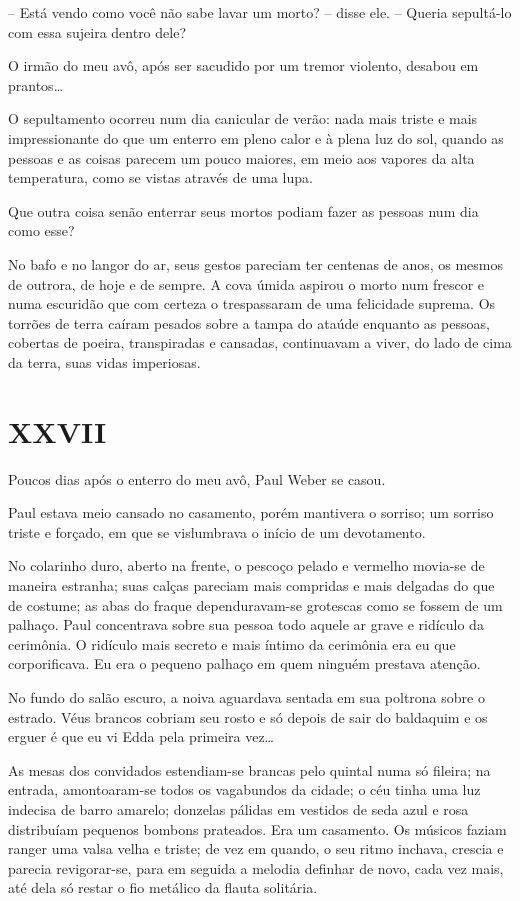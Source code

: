 -- Está vendo como você não sabe lavar um morto? -- disse ele. -- Queria sepultá-lo com essa sujeira dentro dele?

O irmão do meu avô, após ser sacudido por um tremor violento, desabou em prantos\dots

O sepultamento ocorreu num dia canicular de verão: nada mais triste e mais impressionante do que um enterro em pleno calor e à plena luz do sol, quando as pessoas e as coisas parecem um pouco maiores, em meio aos vapores da alta temperatura, como se vistas através de uma lupa.

Que outra coisa senão enterrar seus mortos podiam fazer as pessoas num dia como esse?

No bafo e no langor do ar, seus gestos pareciam ter centenas de anos, os mesmos de outrora, de hoje e de sempre. A cova úmida aspirou o morto num frescor e numa escuridão que com certeza o trespassaram de uma felicidade suprema. Os torrões de terra caíram pesados sobre a tampa do ataúde enquanto as pessoas, cobertas de poeira, transpiradas e cansadas, continuavam a viver, do lado de cima da terra, suas vidas imperiosas. 


\chapter*{\centering\Large{XXVII}}

Poucos dias após o enterro do meu avô, Paul Weber se casou.

Paul estava meio cansado no casamento, porém mantivera o sorriso; um sorriso triste e forçado, em que se vislumbrava o início de um devotamento.

No colarinho duro, aberto na frente, o pescoço pelado e vermelho movia-se de maneira estranha; suas calças pareciam mais compridas e mais delgadas do que de costume; as abas do fraque dependuravam-se grotescas como se fossem de um palhaço. Paul concentrava sobre sua pessoa todo aquele ar grave e ridículo da cerimônia. O ridículo mais secreto e mais íntimo da cerimônia era eu que corporificava. Eu era o pequeno palhaço em quem ninguém prestava atenção.

No fundo do salão escuro, a noiva aguardava sentada em sua poltrona sobre o estrado. Véus brancos cobriam seu rosto e só depois de sair do baldaquim e os erguer é que eu vi Edda pela primeira vez\dots

As mesas dos convidados estendiam-se brancas pelo quintal numa só fileira; na entrada, amontoaram-se todos os vagabundos da cidade; o céu tinha uma luz indecisa de barro amarelo; donzelas pálidas em vestidos de seda azul e rosa distribuíam pequenos bombons prateados. Era um casamento. Os músicos faziam ranger uma valsa velha e triste; de vez em quando, o seu ritmo inchava, crescia e parecia revigorar-se, para em seguida a melodia definhar de novo, cada vez mais, até dela só restar o fio metálico da flauta solitária.

